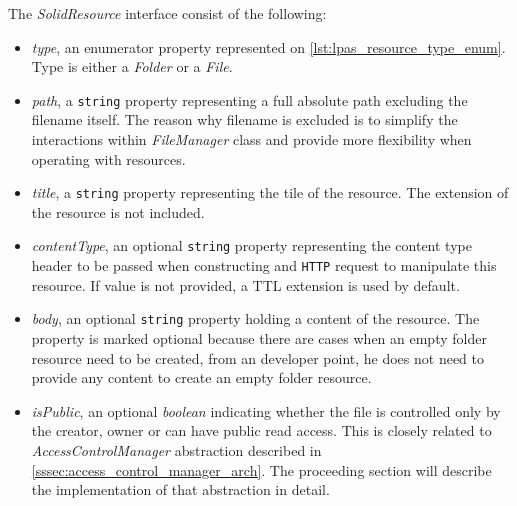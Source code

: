 The \textit{SolidResource} interface consist of the following:
\begin{itemize}
    \item \textit{type}, an enumerator property represented on \autoref{lst:lpas_resource_type_enum}. Type is either a \textit{Folder} or a \textit{File}.
    \item \textit{path}, a \texttt{string} property representing a full absolute path excluding the filename itself. The reason why filename is excluded is to simplify the interactions within \textit{FileManager} class and provide more flexibility when operating with resources.
    \item \textit{title}, a \texttt{string} property representing the tile of the resource. The extension of the resource is not included.
    \item \textit{contentType}, an optional \texttt{string} property representing the content type header to be passed when constructing and \texttt{HTTP} request to  manipulate this resource. If value is not provided, a TTL extension is used by default.
    \item \textit{body}, an optional \texttt{string} property holding a content of the resource. The property is marked optional because there are cases when an empty folder resource need to be created, from an \lpa{} developer point, he does not need to provide any content to create an empty folder resource.
    \item \textit{isPublic}, an optional \textit{boolean} indicating whether the file is controlled only by the creator, owner or can have public read access. This is closely related to \textit{AccessControlManager} abstraction described in \autoref{sssec:access_control_manager_arch}. The proceeding section will describe the implementation of that abstraction in detail.  
\end{itemize}

